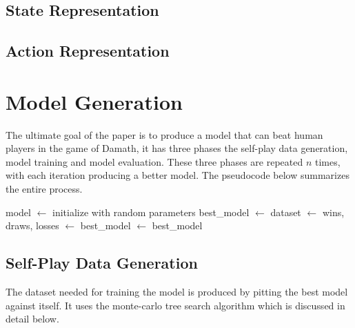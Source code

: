 
\subsection{State Representation}


\subsection{Action Representation}



\section{Model Generation}

The ultimate goal of the paper is to produce a model that can beat human players in the game of Damath, it has three phases the self-play data generation, model training and model evaluation. These three phases are repeated $n$ times, with each iteration producing a better model. The pseudocode below summarizes the entire process. 

\begin{algorithm}[htb]
    \begin{algorithmic}[1]
          \State model $\gets$ initialize with random parameters
          \State best\_model $\gets$ 
          \Repeat
            \State dataset $\gets$ 
            \State {}
            \State wins, draws, losses $\gets$ 
                \State best\_model $\gets$ 
            \EndIf
           \State \Return best\_model
        \EndFunction
    \end{algorithmic}
\end{algorithm}


\subsection{Self-Play Data Generation}

The dataset needed for training the model is produced by pitting the best model against itself. It uses the monte-carlo tree search algorithm which is discussed in detail below.

